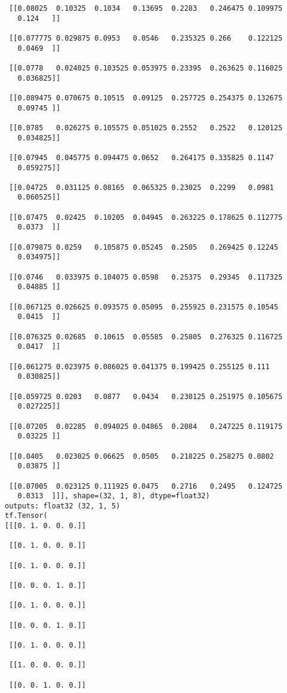 \documentclass[
  letterpaper,
  DIV=11,
  numbers=noendperiod]{scrreprt}
\begin{document}
\begin{verbatim}
 [[0.08025  0.10325  0.1034   0.13695  0.2283   0.246475 0.109975
   0.124   ]]

 [[0.077775 0.029875 0.0953   0.0546   0.235325 0.266    0.122125
   0.0469  ]]

 [[0.0778   0.024025 0.103525 0.053975 0.23395  0.263625 0.116025
   0.036825]]

 [[0.089475 0.070675 0.10515  0.09125  0.257725 0.254375 0.132675
   0.09745 ]]

 [[0.0785   0.026275 0.105575 0.051025 0.2552   0.2522   0.120125
   0.034825]]

 [[0.07945  0.045775 0.094475 0.0652   0.264175 0.335825 0.1147
   0.059275]]

 [[0.04725  0.031125 0.08165  0.065325 0.23025  0.2299   0.0981
   0.060525]]

 [[0.07475  0.02425  0.10205  0.04945  0.263225 0.178625 0.112775
   0.0373  ]]

 [[0.079875 0.0259   0.105875 0.05245  0.2505   0.269425 0.12245
   0.034975]]

 [[0.0746   0.033975 0.104075 0.0598   0.25375  0.29345  0.117325
   0.04885 ]]

 [[0.067125 0.026625 0.093575 0.05095  0.255925 0.231575 0.10545
   0.0415  ]]

 [[0.076325 0.02685  0.10615  0.05585  0.25805  0.276325 0.116725
   0.0417  ]]

 [[0.061275 0.023975 0.086025 0.041375 0.199425 0.255125 0.111
   0.030825]]

 [[0.059725 0.0203   0.0877   0.0434   0.230125 0.251975 0.105675
   0.027225]]

 [[0.07205  0.02285  0.094025 0.04865  0.2084   0.247225 0.119175
   0.03225 ]]

 [[0.0405   0.023025 0.06625  0.0505   0.218225 0.258275 0.0802
   0.03875 ]]

 [[0.07005  0.023125 0.111925 0.0475   0.2716   0.2495   0.124725
   0.0313  ]]], shape=(32, 1, 8), dtype=float32)
outputs: float32 (32, 1, 5)
tf.Tensor(
[[[0. 1. 0. 0. 0.]]

 [[0. 1. 0. 0. 0.]]

 [[0. 1. 0. 0. 0.]]

 [[0. 0. 0. 1. 0.]]

 [[0. 1. 0. 0. 0.]]

 [[0. 0. 0. 1. 0.]]

 [[0. 1. 0. 0. 0.]]

 [[1. 0. 0. 0. 0.]]

 [[0. 0. 1. 0. 0.]]


\end{verbatim}
\end{document}
